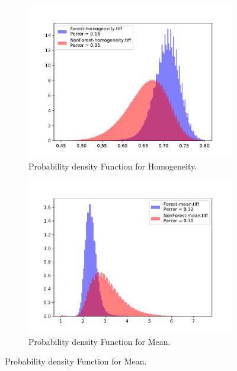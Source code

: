 \begin{figure}[H]\ContinuedFloat
  \centering
  \begin{subfigure}[b]{0.4\linewidth}
    \includegraphics[width=\linewidth]{Chapter5/SENTINEL1/Coherence/homogeneity_histogram.pdf}
     \caption{Probability density Function for Homogeneity.}
  \end{subfigure}
  
  \centering
  \begin{subfigure}[b]{0.4\linewidth}
    \includegraphics[width=\linewidth]{Chapter5/SENTINEL1/Coherence/mean_histogram.pdf}
     \caption{Probability density Function for Mean.}
  \end{subfigure}
  

\end{figure}
